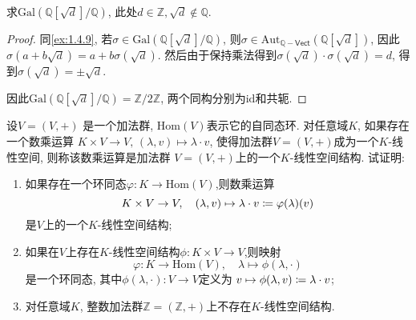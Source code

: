 \begin{problem}
    求$\mathrm{Gal}\left(\mathbb{Q}[\sqrt{d}]/\mathbb{Q}\right)$,
此处$d \in \mathbb{Z}, \sqrt{d} \notin \mathbb{Q}$.
\end{problem}

\begin{proof}
    同\ref{ex:1.4.9}, 若$\sigma \in \mathrm{Gal}\left(\mathbb{Q}[\sqrt{d}]/\mathbb{Q}\right)$, 则$\sigma \in \mathrm{Aut}_{\mathbb{Q}-\mathsf{Vect}}\left(\mathbb{Q}[\sqrt{d}]\right)$, 因此$\sigma(a + b\sqrt{d}) = a + b\sigma(\sqrt{d})$. 然后由于保持乘法得到$\sigma(\sqrt{d}) \cdot \sigma(\sqrt{d}) = d$, 得到$\sigma(\sqrt{d}) = \pm\sqrt{d}$.

    因此$\mathrm{Gal}\left(\mathbb{Q}[\sqrt{d}]/\mathbb{Q}\right) = \mathbb{Z}/2\mathbb{Z}$,
    两个同构分别为$\mathrm{id}$和共轭.
\end{proof}

\begin{problem}\label{ex:1.4.13}
    设$V = (V, +)$ 是一个加法群, $\mathrm{Hom}(V)$表示它的自同态环.
对任意域$K$, 如果存在一个数乘运算
$K \times V \to V,\, (\lambda,v) \mapsto \lambda \cdot v$,
使得加法群$V = (V, +)$成为一个$K$-线性空间, 则称该数乘运算是加法群
$V = (V, +)$上的一个$K$-线性空间结构. 试证明: 
\begin{enumerate}[(1)]
    \item 如果存在一个环同态$\varphi:K \to \mathrm{Hom}(V)$,则数乘运算
\[
    K \times V \to V,\quad (\lambda, v) \mapsto \lambda \cdot v \mathrel{\coloneqq} \varphi(\lambda)(v)
\]
是$V$上的一个$K$-线性空间结构;
    \item 如果在$V$上存在$K$-线性空间结构$\phi:K \times V \to V$,则映射
\[
    \varphi:K \to \mathrm{Hom}(V),\quad \lambda \mapsto \phi(\lambda, \cdot)
\]
是一个环同态, 其中$\phi(\lambda, \cdot):V \to V$定义为
$v \mapsto \phi(\lambda, v) \mathrel{\coloneqq} \lambda \cdot v$;
    \item 对任意域$K$, 整数加法群$\mathbb{Z} = (\mathbb{Z}, +)$上不存在$K$-线性空间结构.
\end{enumerate}
\end{problem}

